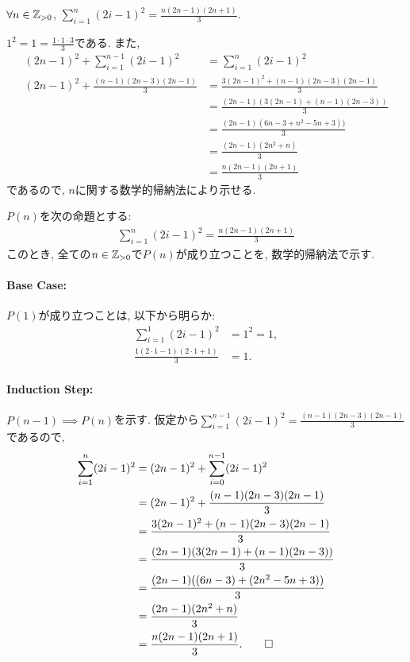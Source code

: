 \begin{prop}
  $\forall n\in\mathbb{Z}_{>0}$, $\sum_{i=1}^{n}(2i-1)^2=\frac{n(2n-1)(2n+1)}{3}$.
\end{prop}
\begin{proof**}
  $1^2=1=\frac{1\cdot 1\cdot 3}{3}$である.
  また,
  \begin{align*}
    (2n-1)^2+\sum_{i=1}^{n-1}(2i-1)^2&=\sum_{i=1}^{n}(2i-1)^2\\
    (2n-1)^2+\frac{(n-1)(2n-3)(2n-1)}{3}
    &=\frac{3(2n-1)^2+(n-1)(2n-3)(2n-1)}{3}\\
    &=\frac{(2n-1)(3(2n-1)+(n-1)(2n-3))}{3}\\
    &=\frac{(2n-1)(6n-3+n^2-5n+3))}{3}\\
    &=\frac{(2n-1)(2n^2+n)}{3}\\
    &=\frac{n(2n-1)(2n+1)}{3}
  \end{align*}
  であるので,
  $n$に関する数学的帰納法により示せる.
\end{proof**}
\begin{proof*}
  $P(n)$を次の命題とする:
  \begin{align*}
    \sum_{i=1}^{n}(2i-1)^2=\frac{n(2n-1)(2n+1)}{3}
  \end{align*}
  このとき,
  全ての$n\in\mathbb{Z}_{>0}$で$P(n)$が成り立つことを,
  数学的帰納法で示す.

  \paragraph{Base Case:}
  $P(1)$が成り立つことは, 以下から明らか:
  \begin{align*}
    \sum_{i=1}^{1}(2i-1)^2&=1^2=1,\\
    \frac{1(2\cdot 1-1)(2\cdot 1+1)}{3}&=1.
  \end{align*}

  \paragraph{Induction Step:}
  $P(n-1)\implies P(n)$を示す.
  仮定から$\sum_{i=1}^{n-1}(2i-1)^2=\frac{(n-1)(2n-3)(2n-1)}{3}$であるので,
  \begin{align*}
    \sum_{i=1}^{n}(2i-1)^2&=(2n-1)^2+\sum_{i=0}^{n-1}(2i-1)^2\\
    &=(2n-1)^2+\frac{(n-1)(2n-3)(2n-1)}{3}\\
    &=\frac{3(2n-1)^2+(n-1)(2n-3)(2n-1)}{3}\\
    &=\frac{(2n-1)(3(2n-1)+(n-1)(2n-3))}{3}\\
    &=\frac{(2n-1)((6n-3)+(2n^2-5n+3))}{3}\\
    &=\frac{(2n-1)(2n^2+n)}{3}\\
    &=\frac{n(2n-1)(2n+1)}{3}
    .\qedhere
  \end{align*}
\end{proof*}


